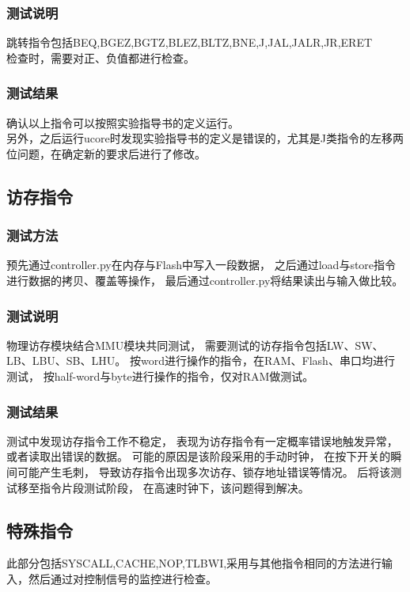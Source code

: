         \subsubsection{测试说明}
        跳转指令包括BEQ,BGEZ,BGTZ,BLEZ,BLTZ,BNE,J,JAL,JALR,JR,ERET \\
        检查时，需要对正、负值都进行检查。

        \subsubsection{测试结果}
        确认以上指令可以按照实验指导书的定义运行。\\
        另外，之后运行ucore时发现实验指导书的定义是错误的，尤其是J类指令的左移两位问题，在确定新的要求后进行了修改。

    \subsection{访存指令}
        \subsubsection{测试方法}
        预先通过controller.py在内存与Flash中写入一段数据，%
        之后通过load与store指令进行数据的拷贝、覆盖等操作，%
        最后通过controller.py将结果读出与输入做比较。

        \subsubsection{测试说明}
        物理访存模块结合MMU模块共同测试，%
        需要测试的访存指令包括LW、SW、LB、LBU、SB、LHU。%
        按word进行操作的指令，在RAM、Flash、串口均进行测试，%
        按half-word与byte进行操作的指令，仅对RAM做测试。

        \subsubsection{测试结果}
        测试中发现访存指令工作不稳定，%
        表现为访存指令有一定概率错误地触发异常，%
        或者读取出错误的数据。%
        可能的原因是该阶段采用的手动时钟，%
        在按下开关的瞬间可能产生毛刺，%
        导致访存指令出现多次访存、锁存地址错误等情况。%
        后将该测试移至指令片段测试阶段，%
        在高速时钟下，该问题得到解决。

    \subsection{特殊指令}
        此部分包括SYSCALL,CACHE,NOP,TLBWI,采用与其他指令相同的方法进行输入，然后通过对控制信号的监控进行检查。
